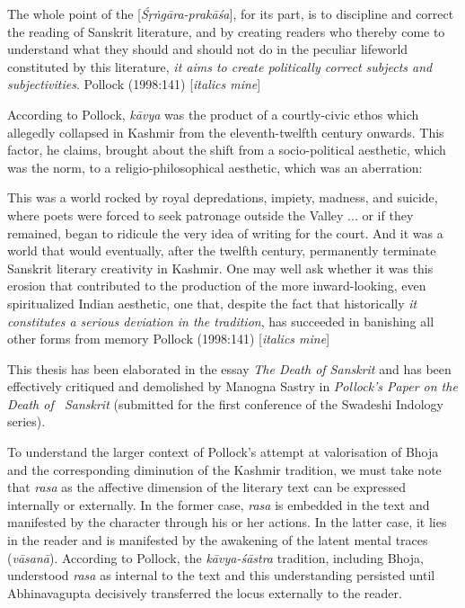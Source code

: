 \begin{myquote}
The whole point of the [\textsl{Śṛṅgāra-prakāśa}], for its part, is to discipline and correct the reading of Sanskrit literature, and by creating readers who thereby come to understand what they should and should not do in the peculiar lifeworld constituted by this literature, \textsl{it aims to create politically correct subjects and subjectivities}. 
\hfill Pollock (1998:141) [\textsl{italics mine}]
\end{myquote}

According to Pollock, \textsl{kāvya} was the product of a courtly-civic ethos which allegedly collapsed in Kashmir from the eleventh-twelfth century onwards. This factor, he claims, brought about the shift from a socio-political aesthetic, which was the norm, to a religio-philosophical aesthetic, which was an aberration:

\begin{myquote}
This was a world rocked by royal depredations, impiety, madness, and suicide, where poets were forced to seek patronage outside the Valley ... or if they remained, began to ridicule the very idea of writing for the court. And it was a world that would eventually, after the twelfth century, permanently terminate Sanskrit literary creativity in Kashmir. One may well ask whether it was this erosion that contributed to the production of the more inward-looking, even spiritualized Indian aesthetic, one that, despite the fact that historically \textsl{it constitutes a serious deviation in the tradition}, has succeeded in banishing all other forms from memory
\hfill Pollock (1998:141) [\textsl{italics mine}]
\end{myquote}


This thesis has been elaborated in the essay \textsl{The Death of Sanskrit} and has been effectively critiqued and demolished by Manogna Sastry in \textsl{Pollock's Paper on the Death of \ Sanskrit} (submitted for the first conference of the Swadeshi Indology series).

To understand the larger context of Pollock's attempt at valorisation of Bhoja and the corresponding diminution of the Kashmir tradition, we must take note that \textsl{rasa} as the affective dimension of the literary text can be expressed internally or externally. In the former case, \textsl{rasa} is embedded in the text and manifested by the character through his or her actions. In the latter case, it lies in the reader and is manifested by the awakening of the latent mental traces (\textsl{vāsanā}). According to Pollock, the \textsl{kāvya-śāstra} tradition, including Bhoja, understood \textsl{rasa} as internal to the text and this understanding persisted until Abhinavagupta decisively transferred the locus externally to the reader. 

